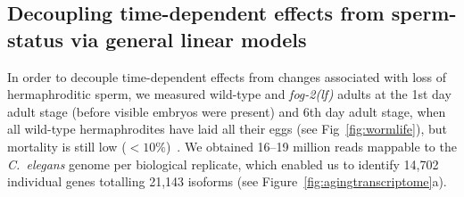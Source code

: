 \documentclass[9pt,twocolumn,twoside]{gsag3jnl}
\newcommand{\cel}{\emph{C.~elegans}}
\newcommand{\fog}{\emph{\mbox{fog-2(lf)}}}
\begin{document}
\subsection*{Decoupling time-dependent effects from sperm-status via general
linear models}
\label{sub:Transcriptomics}
In order to decouple time-dependent effects from changes associated with loss
of hermaphroditic sperm, we measured wild-type and \fog{} adults at the 1st day
adult stage (before visible embryos were present) and 6th day adult stage, when
all wild-type hermaphrodites have laid all their eggs (see
Fig~\ref{fig:wormlife}), but mortality is still low
($<10\%$)~\citep{Stroustrup2013}.  We obtained 16--19 million reads mappable to
the \cel{} genome per biological replicate, which enabled us to identify
14,702 individual genes totalling 21,143 isoforms (see
Figure~\ref{fig:agingtranscriptome}a).
\end{document}
